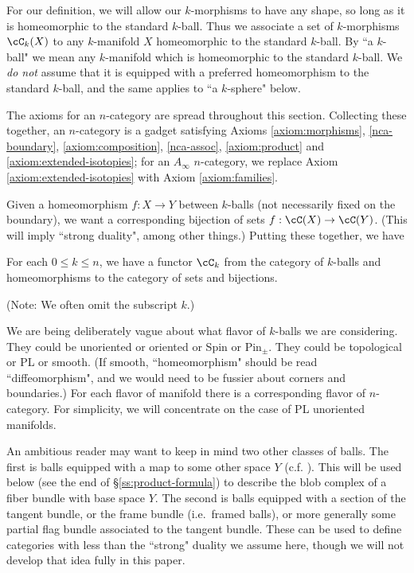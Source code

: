For our definition, we will allow our $k$-morphisms to have any shape, so long as it is homeomorphic to the standard $k$-ball.
Thus we associate a set of $k$-morphisms $\cC_k(X)$ to any $k$-manifold $X$ homeomorphic 
to the standard $k$-ball.
By ``a $k$-ball" we mean any $k$-manifold which is homeomorphic to the 
standard $k$-ball.
We {\it do not} assume that it is equipped with a 
preferred homeomorphism to the standard $k$-ball, and the same applies to ``a $k$-sphere" below.

The axioms for an $n$-category are spread throughout this section.
Collecting these together, an $n$-category is a gadget satisfying Axioms \ref{axiom:morphisms}, \ref{nca-boundary}, \ref{axiom:composition},  \ref{nca-assoc}, \ref{axiom:product} and \ref{axiom:extended-isotopies}; for an $A_\infty$ $n$-category, we replace Axiom \ref{axiom:extended-isotopies} with Axiom \ref{axiom:families}.


Given a homeomorphism $f:X\to Y$ between $k$-balls (not necessarily fixed on 
the boundary), we want a corresponding
bijection of sets $f:\cC(X)\to \cC(Y)$.
(This will imply ``strong duality", among other things.) Putting these together, we have

\begin{axiom}[Morphisms]
\label{axiom:morphisms}
For each $0 \le k \le n$, we have a functor $\cC_k$ from 
the category of $k$-balls and 
homeomorphisms to the category of sets and bijections.
\end{axiom}


(Note: We often omit the subscript $k$.)

We are being deliberately vague about what flavor of $k$-balls
we are considering.
They could be unoriented or oriented or Spin or $\mbox{Pin}_\pm$.
They could be topological or PL or smooth.
(If smooth, ``homeomorphism" should be read ``diffeomorphism", and we would need
to be fussier about corners and boundaries.)
For each flavor of manifold there is a corresponding flavor of $n$-category.
For simplicity, we will concentrate on the case of PL unoriented manifolds.

An ambitious reader may want to keep in mind two other classes of balls.
The first is balls equipped with a map to some other space $Y$ (c.f. \cite{MR2079378}). 
This will be used below (see the end of \S \ref{ss:product-formula}) to describe the blob complex of a fiber bundle with
base space $Y$.
The second is balls equipped with a section of the tangent bundle, or the frame
bundle (i.e.\ framed balls), or more generally some partial flag bundle associated to the tangent bundle.
These can be used to define categories with less than the ``strong" duality we assume here,
though we will not develop that idea fully in this paper.

